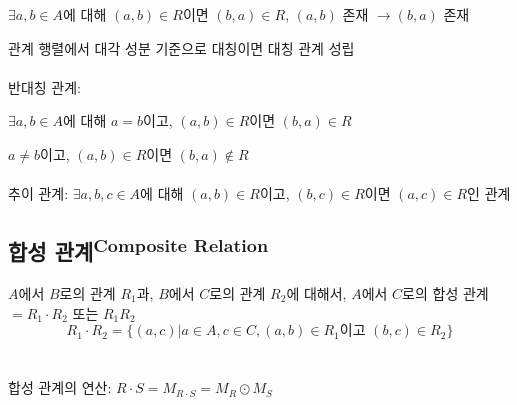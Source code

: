 $\exists a, b \in A$에 대해 $(a, b) \in R$이면 $(b, a) \in R$, $(a, b)$ 존재 $\to (b, a)$ 존재

관계 행렬에서 대각 성분 기준으로 대칭이면 대칭 관계 성립\\\\
반대칭 관계:

$\exists a, b \in A$에 대해 $a = b$이고, $(a, b) \in R$이면 $(b, a) \in R$

$a \neq b$이고, $(a, b) \in R$이면 $(b, a) \not\in R$\\\\
추이 관계: $\exists a, b, c \in A$에 대해 $(a, b) \in R$이고, $(b, c) \in R$이면 $(a, c) \in R$인 관계

\newpage
\subsection{합성 관계\textsuperscript{Composite Relation}}
$A$에서 $B$로의 관계 $R_1$과, $B$에서 $C$로의 관계 $R_2$에 대해서, $A$에서 $C$로의 합성 관계 $= R_1 \cdot R_2$ 또는 $R_1 R_2$
$$R_1 \cdot R_2 = \{(a, c) | a \in A, c \in C, (a, b) \in R_1\text{이고 }(b, c) \in R_2\}$$
\\\\
합성 관계의 연산: $R \cdot S = M_{R \cdot S} = M_R \odot M_S$

